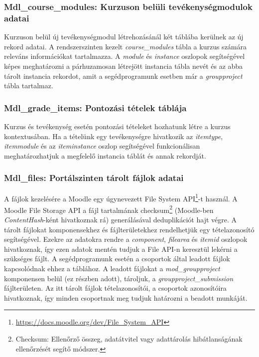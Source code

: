\subsubsection{{\textbf{Mdl\_course\_modules: Kurzuson belüli tevékenységmodulok adatai}}}
 
Kurzuson belül új tevékenységmodul létrehozásánál két táblába kerülnek az új rekord adatai. A rendszerszinten kezelt \textit{course\_modules} tábla a kurzus számára releváns információkat tartalmazza. A \textit{module} és \textit{instance} oszlopok segítségével képes meghatározni a párhuzamosan létrejött instancia tábla nevét és az abba tárolt instancia rekordot, amit a segédprogramunk esetben már a \textit{groupproject} tábla tartalmaz.

\subsubsection{{\textbf{Mdl\_grade\_items: Pontozási tételek táblája}}}
 
Kurzus és tevékenység esetén pontozási tételeket hozhatunk létre a kurzus kontextusában. Ha a tételünk egy tevékenységre hivatkozik az \textit{itemtype}, \textit{itemmodule} és az \textit{iteminstance} oszlop segítségével funkcionálisan meghatározhatjuk a megfelelő instancia táblát és annak rekordját.

\subsubsection{{\textbf{Mdl\_files: Portálszinten tárolt fájlok adatai}}}
 
A fájlok kezelésére a Moodle egy úgynevezett File System API\footnote{\url{https://docs.moodle.org/dev/File_System_API}}-t használ. A Moodle File Storage API a fájl tartalmának checksum\footnote{Checksum: Ellenőrző összeg, adatátvitel vagy adattárolás hibátlanságának ellenőrzését segítő módszer.} (Moodle-ben \textit{ContentHash}-ként hivatkoznak rá) generálásával deduplikációt hajt végre. A tárolt fájlokat komponensekhez és fájlterületekhez rendelhetjük egy tételazonosító segítségével. Ezekre az adatokra rendre a \textit{component}, \textit{filearea} és \textit{itemid} oszlopok hivatkoznak, így ezen adatok mentén tudjuk a File API-n keresztül lekérni a szükséges fájlt. A segédprogramunk esetén a csoportok által leadott fájlok kapcsolódnak ehhez a táblához. A leadott fájlokat a \textit{mod\_groupproject} komponensen belül (ez részben adott), tároljuk, a \textit{groupproject\_submission} fájlterületen. Az itt tárolt fájlok tételazonosítói, a csoportok azonosítóira hivatkoznak, így minden csoportnak meg tudjuk határozni a beadott munkáját.

